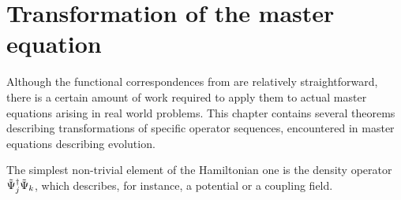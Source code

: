 \chapter{Transformation of the master equation}
\label{cha:wigner-spec}

Although the functional correspondences from  are relatively straightforward, there is a certain amount of work required to apply them to actual master equations arising in real world problems.
This chapter contains several theorems describing transformations of specific operator sequences,
encountered in master equations describing  evolution.

The simplest non-trivial element of the Hamiltonian one is the density operator $\tilde{\Psi}_j^\dagger \tilde{\Psi}_k$, which describes, for instance, a potential or a coupling field.

